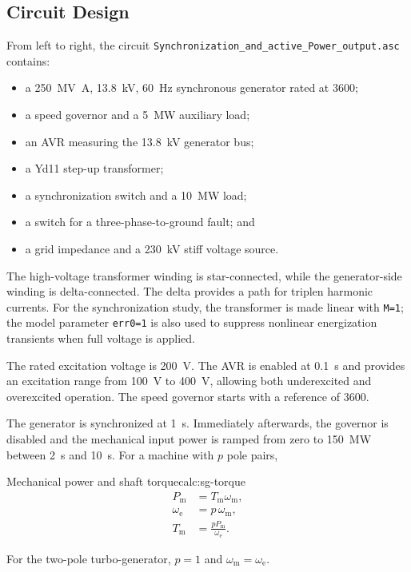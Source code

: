 \subsection{Circuit Design}

From left to right, the circuit \texttt{Synchronization\_and\_active\_Power\_output.asc} contains:

\begin{itemize}
  \item a \SI{250}{\mega\volt\ampere}, \SI{13.8}{\kilo\volt},
        \SI{60}{\hertz} synchronous generator rated at
        \SI{3600}{\rpm};
  \item a speed governor and a \SI{5}{\mega\watt} auxiliary load;
  \item an AVR measuring the \SI{13.8}{\kilo\volt} generator bus;
  \item a Yd11 step-up transformer;
  \item a synchronization switch and a \SI{10}{\mega\watt} load;
  \item a switch for a three-phase-to-ground fault; and
  \item a grid impedance and a \SI{230}{\kilo\volt} stiff voltage source.
\end{itemize}

The high-voltage transformer winding is star-connected, while the
generator-side winding is delta-connected. The delta provides a path for
triplen harmonic currents. For the synchronization study, the transformer is
made linear with \texttt{M=1}; the model parameter \texttt{err0=1} is also used
to suppress nonlinear energization transients when full voltage is applied.

The rated excitation voltage is \SI{200}{\volt}. The AVR is enabled at
\SI{0.1}{\second} and provides an excitation range from
\SI{100}{\volt} to \SI{400}{\volt}, allowing both underexcited and
overexcited operation. The speed governor starts with a reference of
\SI{3600}{\rpm}.

The generator is synchronized at \SI{1}{\second}. Immediately afterwards,
the governor is disabled and the mechanical input power is ramped from zero to
\SI{150}{\mega\watt} between \SI{2}{\second} and
\SI{10}{\second}. For a machine with $p$ pole pairs,

\begin{calculation}{Mechanical power and shaft torque}{calc:sg-torque}
\begin{align}
  P_{\mathrm{m}} &= T_{\mathrm{m}}\omega_{\mathrm{m}}, \\
  \omega_{\mathrm{e}} &= p\,\omega_{\mathrm{m}}, \\
  T_{\mathrm{m}} &= \frac{pP_{\mathrm{m}}}{\omega_{\mathrm{e}}}.
\end{align}

For the two-pole turbo-generator, $p=1$ and
$\omega_{\mathrm{m}}=\omega_{\mathrm{e}}$.
\end{calculation}


